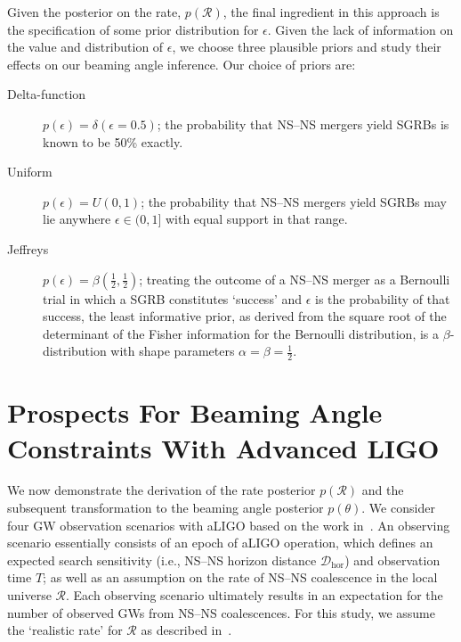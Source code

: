 \documentclass[twocolumn,nofootinbib]{revtex4-1}
\newcommand{\cbcrate}{{{\mathcal R}}}
\newcommand{\dhor}{\ensuremath{{\mathcal D}_{\mathrm{hor}}}}
\newcommand{\BNS}{\ac{NS}--\ac{NS}\xspace}
\begin{document}
Given the posterior on the rate, $p(\cbcrate)$, the final ingredient
in this approach is the specification of some prior distribution for
$\epsilon$. Given the lack of information on the value and distribution
of $\epsilon$, we choose three plausible priors and study their effects
on our beaming angle inference. Our choice of priors are:
%
\begin{description}
\item [Delta-function] $p(\epsilon) = \delta(\epsilon=0.5)$;
        the probability that \BNS mergers yield \acp{SGRB} is known to be 50\%
        exactly.

\item [Uniform] $p(\epsilon)=U(0,1)$;
        the probability that \BNS mergers yield \acp{SGRB} may lie anywhere
    $\epsilon \in (0,1]$ with equal support in that range. 

    \item [Jeffreys] $p(\epsilon)=\beta(\frac{1}{2},\frac{1}{2})$; treating the
        outcome of a \BNS merger as a Bernoulli trial in which a \ac{SGRB}
        constitutes `success' and $\epsilon$ is the probability of that success,
        the least informative prior, as derived from the square root of the
        determinant of the Fisher information for the Bernoulli distribution, is
        a $\beta$-distribution with shape parameters $\alpha=\beta=\frac{1}{2}$.
\end{description}

\section{Prospects For Beaming Angle Constraints With Advanced LIGO}
We now demonstrate the derivation of the rate posterior $p(\cbcrate)$
and the subsequent transformation to the beaming angle posterior
$p(\theta)$.  We consider four \ac{GW} observation scenarios with
\ac{aLIGO} based on the work in~\cite{Aasi:2013wya}.  An observing
scenario essentially consists of an epoch of \ac{aLIGO} operation,
which defines an expected search sensitivity (i.e., \BNS{} horizon
distance $\dhor$) and observation time $T$; as well as an assumption
on the rate of \BNS{} coalescence in the local universe $\cbcrate$.
Each observing scenario ultimately results in an expectation for the
number of observed \acp{GW} from \BNS coalescences.  For this study,
we assume the `realistic rate' for $\cbcrate$ as described
in~\cite{rates_paper}.
\end{document}
